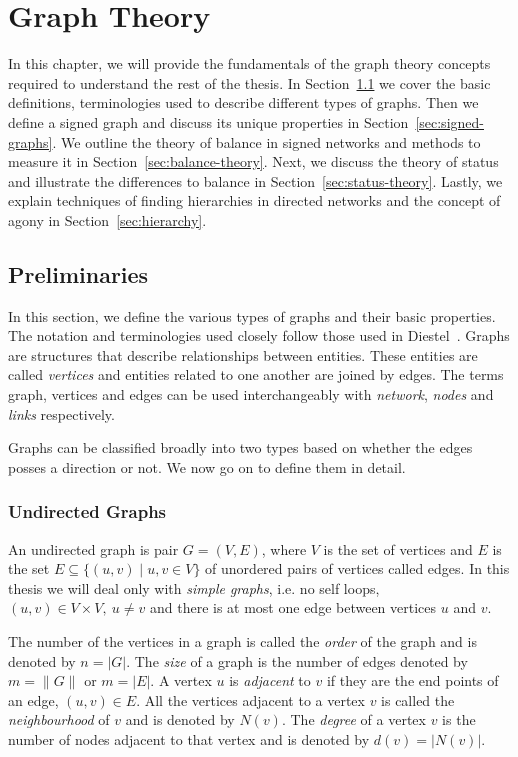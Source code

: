 \chapter{Graph Theory}
\label{chp:graph-theory}
In this chapter, we will provide the fundamentals of the graph theory concepts required to understand the rest of the thesis. In Section~\ref{sec:prelim} we cover the basic definitions, terminologies used to describe different types of graphs. Then we define a signed graph and discuss its unique properties in Section~\ref{sec:signed-graphs}. We outline the theory of balance in signed networks and methods to measure it in Section~\ref{sec:balance-theory}. Next, we discuss the theory of status and illustrate the differences to balance in Section~\ref{sec:status-theory}. Lastly, we explain techniques of finding hierarchies in directed networks and the concept of agony in Section~\ref{sec:hierarchy}.

\section{Preliminaries}
\label{sec:prelim}
In this section, we define the various types of graphs and their basic properties. The notation and terminologies used closely follow those used in Diestel~\cite{diestel1997graph}. Graphs are structures that describe relationships between entities. These entities are called \textit{vertices} and entities related to one another are joined by edges. The terms graph, vertices and edges can be used interchangeably with \textit{network}, \textit{nodes} and \textit{links} respectively.

Graphs can be classified broadly into two types based on whether the edges posses a direction or not. We now go on to define them in detail.
\subsection{Undirected Graphs}
An undirected graph is pair $G=(V,E)$, where $V$ is the set of vertices and $E$ is the set $E \subseteq \{ (u,v) \mid u,v \in V\}$ of unordered pairs of vertices called edges. In this thesis we will deal only with \textit{simple graphs}, i.e. no self loops, $(u,v)\in V \times V, ~ u\neq v$ and there is at most one edge between vertices $u$ and $v$. 

The number of the vertices in a graph is called the \textit{order} of the graph and is denoted by $n= |G|$. The \textit{size} of a graph is the number of edges denoted by $m = \|G\|$ or $m=|E|$. A vertex $u$ is \textit{adjacent} to $v$ if they are the end points of an edge, $(u,v) \in E$. All the vertices adjacent to a vertex $v$ is called the \textit{neighbourhood} of $v$ and is denoted by $N(v)$. The \textit{degree} of a vertex $v$ is the number of nodes adjacent to that vertex and is denoted by $d(v) = |N(v)|$. 

